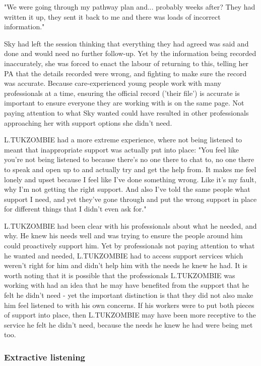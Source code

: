 "We were going through my pathway plan and... probably weeks after? They had written it up, they sent it back to me and there was loads of incorrect information."

Sky had left the session thinking that everything they had agreed was said and done and would need no further follow-up. Yet by the information being recorded inaccurately, she was forced to enact the labour of returning to this, telling her PA that the details recorded were wrong, and fighting to make sure the record was accurate. Because care-experienced young people work with many professionals at a time, ensuring the official record ('their file') is accurate is important to ensure everyone they are working with is on the same page. Not paying attention to what Sky wanted could have resulted in other professionals approaching her with support options she didn't need.

L.TUKZOMBIE had a more extreme experience, where not being listened to meant that inappropriate support was actually put into place:
"You feel like you're not being listened to because there's no one there to chat to, no one there to speak and open up to and actually try and get the help from. It makes me feel lonely and upset because I feel like I've done something wrong. Like it's my fault, why I'm not getting the right support. And also I've told the same people what support I need, and yet they've gone through and put the wrong support in place for different things that I didn't even ask for."

L.TUKZOMBIE had been clear with his professionals about what he needed, and why. He knew his needs well and was trying to ensure the people around him could proactively support him. Yet by professionals not paying attention to what he wanted and needed, L.TUKZOMBIE had to access support services which weren't right for him and didn't help him with the needs he knew he had. It is worth noting that it is possible that the professionals L.TUKZOMBIE was working with had an idea that he may have benefited from the support that he felt he didn't need - yet the important distinction is that they did not also make him feel listened to with his own concerns. If his workers were to put both pieces of support into place, then L.TUKZOMBIE may have been more receptive to the service he felt he didn't need, because the needs he knew he had were being met too.

\subsubsection{Extractive listening}

